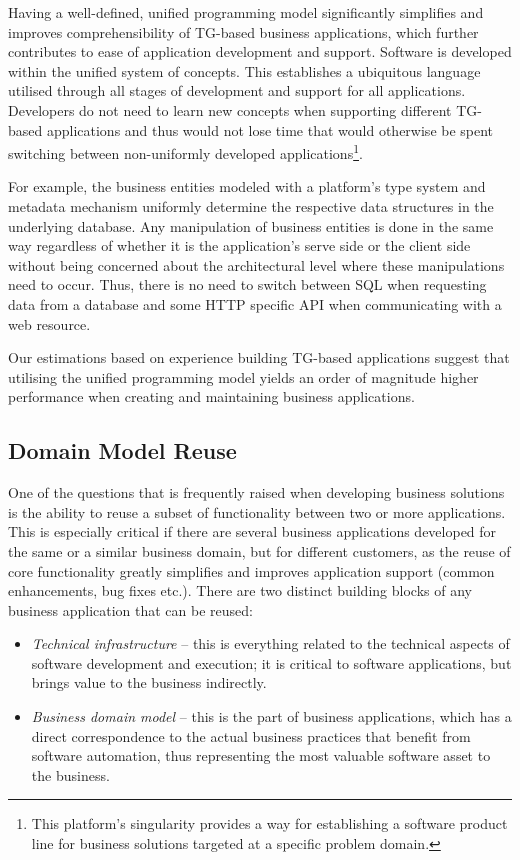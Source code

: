   Having a well-defined, unified programming model significantly simplifies and improves comprehensibility of TG-based business applications, which further contributes to ease of application development and support.
  Software is developed within the unified system of concepts.
  This establishes a ubiquitous language utilised through all stages of development and support for all applications.
  Developers do not need to learn new concepts when supporting different TG-based applications and thus would not lose time that would otherwise be spent switching between non-uniformly developed applications\footnote{This platform's singularity provides a way for establishing a software product line for business solutions targeted at a specific problem domain.}.
  
  For example, the business entities modeled with a platform's type system and metadata mechanism uniformly determine the respective data structures in the underlying database.
  Any manipulation of business entities is done in the same way regardless of whether it is the application's serve side or the client side without being concerned about the architectural level where these manipulations need to occur.
  Thus, there is no need to switch between SQL when requesting data from a database and some HTTP specific API when communicating with a web resource.

  Our estimations based on experience building TG-based applications suggest that utilising the unified programming model yields an order of magnitude higher performance when creating and maintaining business applications.

\subsection{Domain Model Reuse}
  One of the questions that is frequently raised when developing business solutions is the ability to reuse a subset of functionality between two or more applications.
  This is especially critical if there are several business applications developed for the same or a similar business domain, but for different customers, as the reuse of core functionality greatly simplifies and improves application support (common enhancements, bug fixes etc.).
  There are two distinct building blocks of any business application that can be reused:
  \begin{itemize}
   \item \emph{Technical infrastructure} -- this is everything related to the technical aspects of software development and execution; it is critical to software applications, but brings value to the business indirectly.
    \item \emph{Business domain model} --  this is the part of business applications, which has a direct correspondence to the actual business practices that benefit from software automation, thus representing the most valuable software asset to the business.
  \end{itemize}

